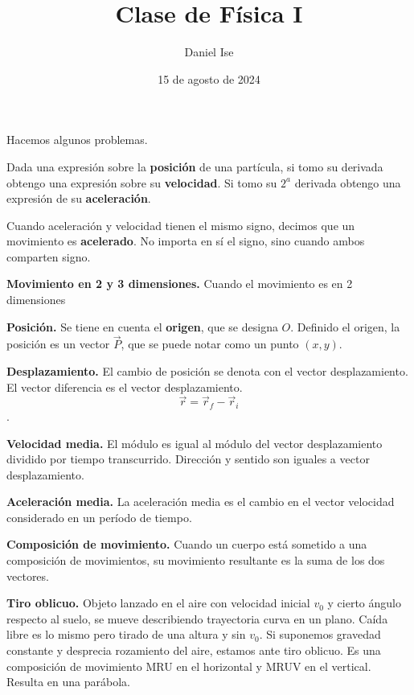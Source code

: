 \documentclass{article}
\title{Clase de Física I}
\author{Daniel Ise}
\date{15 de agosto de 2024}
\begin{document}
\maketitle

Hacemos algunos problemas.

Dada una expresión sobre la \textbf{posición} de una partícula, si tomo su
derivada obtengo una expresión sobre su \textbf{velocidad}. Si tomo su $2^a$
derivada obtengo una expresión de su \textbf{aceleración}.

Cuando aceleración y velocidad tienen el mismo signo, decimos que un movimiento
es \textbf{acelerado}. No importa en sí el signo, sino cuando ambos comparten
signo.

\textbf{Movimiento en 2 y 3 dimensiones.} Cuando el movimiento es en 2
dimensiones

\textbf{Posición.} Se tiene en cuenta el \textbf{origen}, que se designa $O$.
Definido el origen, la posición es un vector $\vec{P}$, que se puede notar
como un punto $(x,y)$.

\textbf{Desplazamiento.} El cambio de posición se denota con el vector
desplazamiento. El vector diferencia es el vector desplazamiento.
$$\vec{r} = \vec{r}_f - \vec{r}_i$$.

\textbf{Velocidad media.} El módulo es igual al módulo del vector desplazamiento
dividido por tiempo transcurrido. Dirección y sentido son iguales a vector
desplazamiento.

\textbf{Aceleración media.} La aceleración media es el cambio en el vector 
velocidad considerado en un período de tiempo. 

\textbf{Composición de movimiento.} Cuando un cuerpo está sometido a una 
composición de movimientos, su movimiento resultante es la suma de los dos 
vectores.

\textbf{Tiro oblicuo.} Objeto lanzado en el aire con velocidad inicial $v_0$ y 
cierto ángulo respecto al suelo, se mueve describiendo trayectoria 
curva en un plano. Caída libre es lo mismo pero tirado de una altura y sin 
$v_0$. Si suponemos gravedad constante y desprecia rozamiento del aire, estamos
ante tiro oblicuo. Es una composición de movimiento MRU en el horizontal y MRUV
en el vertical. Resulta en una parábola.
\end{document}
